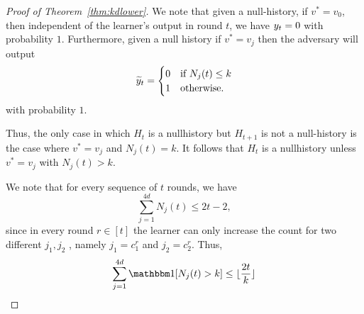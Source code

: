\documentclass[11pt,letterpaper]{article}
\theoremstyle{definition}
\theoremstyle{plain}
\begin{document}
\begin{proof}[Proof of Theorem~\ref{thm:kdlower}]
We note that given a null-history, if $v^* = v_0$, then independent of the learner's output in round $t$, we have $y_t = 0$ with probability $1$.
Furthermore, given a null history if $v^* = v_j$ then the adversary will output
\[ {\widetilde{y}}_t = \begin{cases}
    0 &\text{if } N_{j}(t) \leq k \\
        1 &\text{otherwise.}
\end{cases}\]
with probability $1$.

Thus, the only case in which $H_t$ is a nullhistory but $H_{t+1}$ is not a null-history is the case where
$v^* = v_j$ and $ N_j(t) = k $.
It follows that $H_t$ is a nullhistory unless $v^* =v_j$ with $N_j(t) >k$.



We note that for every sequence of $t$ rounds, we have
\[
\sum_{j=1}^{4d} N_j(t) \leq 2t-2,
\]
since in every round $r \in [t]$ the learner can only increase the count for two different $j_1,j_2$ , namely $j_1= c_1^r$ and $j_2 = c_2^r$. 
Thus,
\[
\sum_{j=1}^{4d} \indct[N_j(t) > k] \leq \lfloor \frac{2t}{k} \rfloor
\]


\end{proof}
\end{document}
